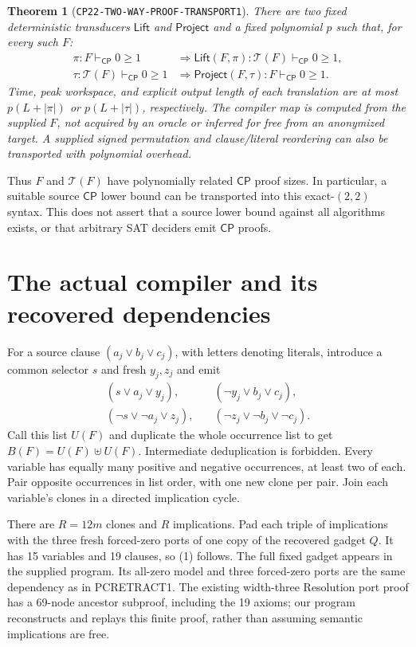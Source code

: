 \documentclass[11pt]{article}
\newtheorem{theorem}{Theorem}
\newcommand{\CP}{\mathsf{CP}}
\newcommand{\TT}{\mathcal T}
\begin{document}
\begin{theorem}[\texttt{CP22-TWO-WAY-PROOF-TRANSPORT1}]\label{thm:main}
There are two fixed deterministic transducers $\mathsf{Lift}$ and
$\mathsf{Project}$ and a fixed polynomial $p$ such that, for every such $F$:
\[
\begin{aligned}
 \pi:F\vdash_{\CP}0\ge1
 &\Longrightarrow
 \mathsf{Lift}(F,\pi):\TT(F)\vdash_{\CP}0\ge1,\\
 \tau:\TT(F)\vdash_{\CP}0\ge1
 &\Longrightarrow
 \mathsf{Project}(F,\tau):F\vdash_{\CP}0\ge1.
\end{aligned}                                                        \tag{3}
\]
Time, peak workspace, and explicit output length of each translation are at
most $p(L+|\pi|)$ or $p(L+|\tau|)$, respectively. The compiler map is computed
from the supplied $F$, not acquired by an oracle or inferred for free from an
anonymized target. A supplied signed permutation and clause/literal
reordering can also be transported with polynomial overhead.
\end{theorem}
Thus $F$ and $\TT(F)$ have polynomially related $\CP$ proof sizes. In
particular, a suitable source $\CP$ lower bound can be transported into this
exact-$(2,2)$ syntax. This does not assert that a source lower bound against
all algorithms exists, or that arbitrary SAT deciders emit $\CP$ proofs.

\section{The actual compiler and its recovered dependencies}
For a source clause $(a_j\lor b_j\lor c_j)$, with letters denoting literals,
introduce a common selector $s$ and fresh $y_j,z_j$ and emit
\begin{align*}
 (s\lor a_j\lor y_j),&\quad(\neg y_j\lor b_j\lor c_j),\\
 (\neg s\lor\neg a_j\lor z_j),&\quad
 (\neg z_j\lor\neg b_j\lor\neg c_j).
\end{align*}
Call this list $U(F)$ and duplicate the whole occurrence list to get
$B(F)=U(F)\uplus U(F)$. Intermediate deduplication is forbidden. Every
variable has equally many positive and negative occurrences, at least two of
each. Pair opposite occurrences in list order, with one new clone per pair.
Join each variable's clones in a directed implication cycle.

There are $R=12m$ clones and $R$ implications. Pad each triple of
implications with the three fresh forced-zero ports of one copy of the
recovered gadget $Q$. It has 15 variables and 19 clauses, so (1) follows.
The full fixed gadget appears in the supplied program. Its all-zero model
and three forced-zero ports are the same dependency as in PCRETRACT1.
The existing width-three Resolution port proof has a 69-node ancestor
subproof, including the 19 axioms; our program reconstructs and replays this
finite proof, rather than assuming semantic implications are free.
\end{document}
